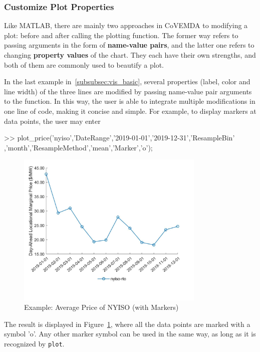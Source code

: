 \documentclass[10pt]{article}
\newcommand{\covemda}{CoVEMDA}
\newcommand{\matlab}{\textsc{MATLAB}}
\numberwithin{equation}{section}
\numberwithin{table}{section}
\numberwithin{figure}{section}
\begin{document}
\subsubsection{Customize Plot Properties} \label{subsubsec:vis_cus}

Like \matlab{}, there are mainly two approaches in \covemda{} to modifying a plot: before and after calling the plotting function. The former way refers to passing arguments in the form of \textbf{name-value pairs}, and the latter one refers to changing \textbf{property values} of the chart. They each have their own strengths, and both of them are commonly used to beautify a plot.

In the last example in~\ref{subsubsec:vis_basic}, several properties (label, color and line width) of the three lines are modified by passing name-value pair arguments to the function. In this way, the user is able to integrate multiple modifications in one line of code, making it concise and simple. For example, to display markers at data points, the user may enter

\begin{Code}
>> plot_price('nyiso','DateRange',{'2019-01-01','2019-12-31'},'ResampleBin'
   ,'month','ResampleMethod','mean','Marker','o');
\end{Code}

\begin{figure}
  \centering
  \noindent\includegraphics[width=0.8\textwidth]{figures/visualization_example4.jpg}
  \caption{Example: Average Price of NYISO (with Markers)} \label{fig:vis_eg4}
\end{figure}

The result is displayed in Figure~\ref{fig:vis_eg4}, where all the data points are marked with a symbol 'o'. Any other marker symbol can be used in the same way, as long as it is recognized by \verb!plot!.
\end{document}
